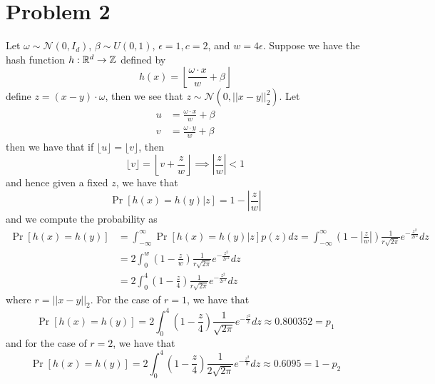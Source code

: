 \documentclass[12pt]{report}
\newcommand{\norm}[1]{\left|\left|#1\right|\right|}
\begin{document}
\section*{Problem 2}
Let $\omega \sim \mathcal{N}(0,I_d)$, $\beta \sim U(0,1)$, $\epsilon = 1, c = 2$, and  $w = 4\epsilon$. Suppose we have the hash function $h: \mathbb{R}^d \to \mathbb{Z}$ defined by
\begin{equation*}
  h(x) = \left\lfloor \frac{\omega \cdot x}{w} + \beta \right\rfloor
\end{equation*}
define $z = (x-y) \cdot \omega$, then we see that $z \sim \mathcal{N}(0,\norm{x-y}_2^2)$. Let
\begin{align*}
  u &= \frac{\omega \cdot x}{w} + \beta \\
  v &= \frac{\omega \cdot y}{w} + \beta
\end{align*}
then we have that if $\lfloor u \rfloor = \lfloor v \rfloor$, then
\begin{equation*}
  \lfloor v \rfloor = \left\lfloor v + \frac{z}{w} \right\rfloor \implies \left|\frac{z}{w}\right| < 1
\end{equation*}
and hence given a fixed $z$, we have that
\begin{equation*}
  \Pr[h(x) = h(y)|z] = 1 - \left|\frac{z}{w}\right|
\end{equation*}
and we compute the probability as
\begin{align*}
  \Pr[h(x) = h(y)] &= \int_{-\infty}^{\infty} \Pr[h(x) = h(y)|z]p(z)dz = \int_{-\infty}^{\infty} \left(1 - \left|\frac{z}{w}\right|\right) \frac{1}{r\sqrt{2\pi}}e^{-\frac{z^2}{2r^2}}dz \\
                   &= 2\int_0^w \left(1 - \frac{z}{w}\right) \frac{1}{r\sqrt{2\pi}}e^{-\frac{z^2}{2r^2}}dz  \\
                   &= 2\int_0^4 \left(1 - \frac{z}{4}\right) \frac{1}{r\sqrt{2\pi}}e^{-\frac{z^2}{2r^2}}dz
\end{align*}
where $r = \norm{x-y}_2$. For the case of $r = 1$, we have that
\begin{equation*}
  \Pr[h(x) = h(y)] = 2\int_0^4 \left(1 - \frac{z}{4}\right) \frac{1}{\sqrt{2\pi}}e^{-\frac{z^2}{2}}dz \approx 0.800352 = p_1
\end{equation*}
and for the case of $r = 2$, we have that
\begin{equation*}
  \Pr[h(x) = h(y)] = 2\int_0^4 \left(1 - \frac{z}{4}\right) \frac{1}{2\sqrt{2\pi}}e^{-\frac{z^2}{8}}dz \approx 0.6095 = 1 - p_2
\end{equation*}
\end{document}
